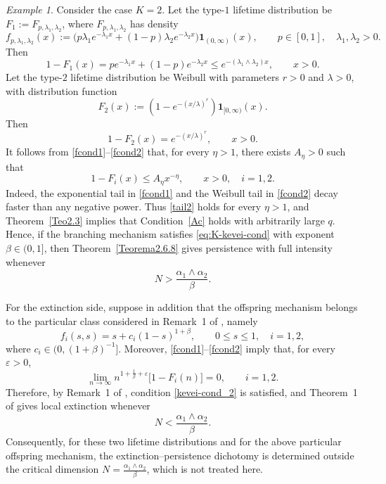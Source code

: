 \documentclass[reqno,final,11pt]{amsart}
\newcommand{\1}{\mathbbm{1}}
\renewcommand{\cite}{\citet}
\theoremstyle{plain}
\theoremstyle{definition}
\theoremstyle{remark}
\newtheorem{example}[theorem]{Example}
\begin{document}
\begin{example}\label{Example1}
Consider the case \(K=2\). Let the type-\(1\) lifetime distribution be
\(F_1:=F_{p,\lambda_1,\lambda_2}\), where \(F_{p,\lambda_1,\lambda_2}\) has density
\[
f_{p,\lambda_1,\lambda_2}(x)
:=
\Big(p\lambda_1e^{-\lambda_1 x}+(1-p)\lambda_2e^{-\lambda_2 x}\Big)
\mathbf 1_{(0,\infty)}(x),
\qquad
p\in[0,1],\quad \lambda_1,\lambda_2>0.
\]
Then
\begin{equation}\label{fcond1}
1-F_1(x)
=
pe^{-\lambda_1 x}+(1-p)e^{-\lambda_2 x}
\le
e^{-(\lambda_1\wedge\lambda_2)x},
\qquad x>0.
\end{equation}
Let the type-\(2\) lifetime distribution be Weibull with parameters \(r>0\) and \(\lambda>0\), with distribution function
\[
F_2(x)
:=
\left(1-e^{-(x/\lambda)^r}\right)\mathbf 1_{[0,\infty)}(x).
\]
Then
\begin{equation}\label{fcond2}
1-F_2(x)
=
e^{-(x/\lambda)^r},
\qquad x>0.
\end{equation}
It follows from \eqref{fcond1}--\eqref{fcond2} that, for every \(\eta>1\), there exists
\(A_\eta>0\) such that
\[
1-F_i(x)\le A_\eta x^{-\eta},
\qquad x>0,\quad i=1,2.
\]
Indeed, the exponential tail in \eqref{fcond1} and the Weibull tail in \eqref{fcond2}
decay faster than any negative power. Thus \eqref{tail2} holds for every \(\eta>1\), and
Theorem~\ref{Teo2.3} implies that Condition~\ref{Ac} holds with arbitrarily large \(q\).
Hence, if the branching mechanism satisfies \eqref{eq:K-kevei-cond} with exponent
\(\beta\in(0,1]\), then Theorem~\ref{Teorema2.6.8} gives persistence with full intensity whenever
\[
N>\frac{\alpha_1\wedge\alpha_2}{\beta}.
\]

For the extinction side, suppose in addition that the offspring mechanism belongs to the particular
class considered in Remark~1 of \cite{Kevei}, namely
\[
f_i(s,s)=s+c_i(1-s)^{1+\beta},
\qquad 0\le s\le1,\quad i=1,2,
\]
where \(c_i\in(0,(1+\beta)^{-1}]\).
Moreover, \eqref{fcond1}--\eqref{fcond2} imply that, for every \(\varepsilon>0\),
\[
\lim_{n\to\infty}
n^{1+\frac1\beta+\varepsilon}\bigl[1-F_i(n)\bigr]
=
0,
\qquad i=1,2.
\]
Therefore, by Remark~1 of \cite{Kevei}, condition \eqref{kevei-cond_2} is satisfied, and
Theorem~1 of \cite{Kevei} gives local extinction whenever
\[
N<\frac{\alpha_1\wedge\alpha_2}{\beta}.
\]
Consequently, for these two lifetime distributions and for the above particular offspring mechanism,
the extinction--persistence dichotomy is determined outside the critical dimension
\(N=\frac{\alpha_1\wedge\alpha_2}{\beta}\), which is not treated here.
\end{example}
\end{document}
